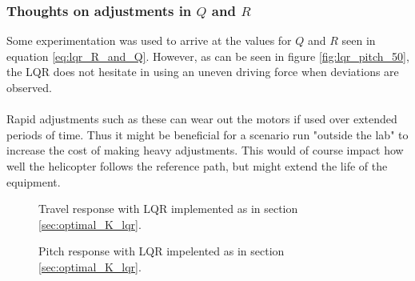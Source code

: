 \subsubsection{Thoughts on adjustments in $Q$ and $R$}
Some experimentation was used to arrive at the values for $Q$ and $R$ seen in equation \ref{eq:lqr_R_and_Q}. However, as can be seen in figure \ref{fig:lqr_pitch_50}, the LQR does not hesitate in using an uneven driving force when deviations are observed.\\
\\
Rapid adjustments such as these can wear out the motors if used over extended periods of time. Thus it might be beneficial for a scenario run "outside the lab" to increase the cost of making heavy adjustments. This would of course impact how well the helicopter follows the reference path, but might extend the life of the equipment.
\begin{figure}
        \centering
        \setlength{\figureheight}{6cm}
        \setlength{\figurewidth}{10cm}
        
        \caption{Travel response with LQR implemented as in section \ref{sec:optimal_K_lqr}.}
        \label{fig:lqr_travel_50}
\label{fig:ex3_travel} 
\end{figure}    
\begin{figure}
        \centering
        \setlength{\figureheight}{6cm}
        \setlength{\figurewidth}{10cm}
        
        \caption{Pitch response with LQR impelented as in section \ref{sec:optimal_K_lqr}.}
        \label{fig:lqr_pitch_50}
\label{fig:ex3_u} 
\end{figure} 
